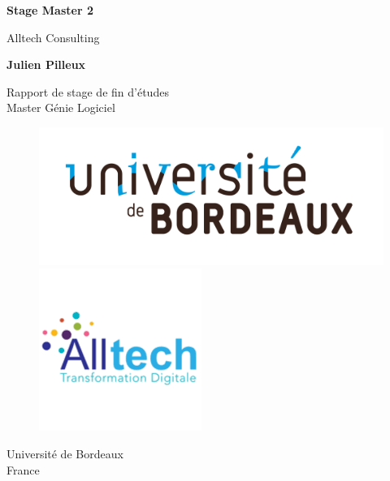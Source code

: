 \begin{titlepage}
   \begin{center}
       \vspace*{1cm}
 
       \textbf{Stage Master 2}
 
       \vspace{0.5cm}
        Alltech Consulting
 
       \vspace{1.5cm}
 
       \textbf{Julien Pilleux}
 
       \vfill
 
       Rapport de stage de fin d'études\\
       Master Génie Logiciel
 
       \vspace{0.8cm}
 
         \begin{figure}[!htb]
           \begin{minipage}{0.48\textwidth}
             \centering
             \includegraphics[width=.7\linewidth]{images/bdx.jpg}
           \end{minipage}\hfill
           \begin{minipage}{0.48\textwidth}
             \centering
             \includegraphics[width=.7\linewidth]{images/alltech.png}
           \end{minipage}
        \end{figure}

       Université de Bordeaux\\
       France\\
       \date{today}
   \end{center}
\end{titlepage}